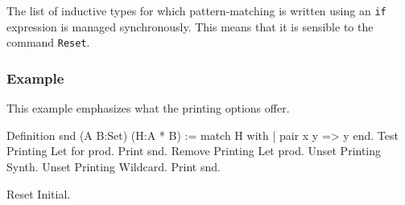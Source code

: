 The list of inductive types for which pattern-matching is written
using an {\tt if} expression is managed synchronously. This means that
it is sensible to the command {\tt Reset}.

\subsubsection{Example}

This example emphasizes what the printing options offer.

\begin{coq_example}
Definition snd (A B:Set) (H:A * B) := match H with
                                      | pair x y => y
                                      end.
Test Printing Let for prod.
Print snd.
Remove Printing Let prod.
Unset Printing Synth.
Unset Printing Wildcard.
Print snd.
\end{coq_example}
\begin{coq_eval}
Reset Initial.
\end{coq_eval}







